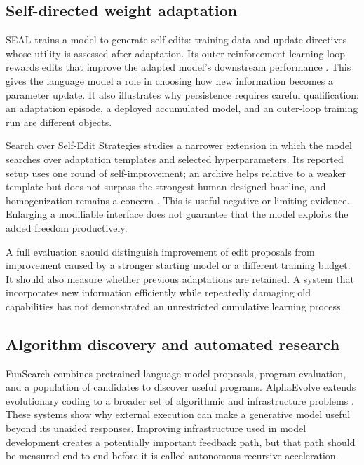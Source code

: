 \documentclass[11pt,american,]{article}
\begin{document}
\hypertarget{self-directed-weight-adaptation}{%
\subsection{Self-directed weight
adaptation}\label{self-directed-weight-adaptation}}

SEAL trains a model to generate self-edits: training data and update
directives whose utility is assessed after adaptation. Its outer
reinforcement-learning loop rewards edits that improve the adapted
model's downstream performance \citep{seal2025}. This gives the language
model a role in choosing how new information becomes a parameter update.
It also illustrates why persistence requires careful qualification: an
adaptation episode, a deployed accumulated model, and an outer-loop
training run are different objects.

Search over Self-Edit Strategies studies a narrower extension in which
the model searches over adaptation templates and selected
hyperparameters. Its reported setup uses one round of self-improvement;
an archive helps relative to a weaker template but does not surpass the
strongest human-designed baseline, and homogenization remains a concern
\citep{selfedit2026}. This is useful negative or limiting evidence.
Enlarging a modifiable interface does not guarantee that the model
exploits the added freedom productively.

A full evaluation should distinguish improvement of edit proposals from
improvement caused by a stronger starting model or a different training
budget. It should also measure whether previous adaptations are
retained. A system that incorporates new information efficiently while
repeatedly damaging old capabilities has not demonstrated an
unrestricted cumulative learning process.

\hypertarget{algorithm-discovery-and-automated-research}{%
\subsection{Algorithm discovery and automated
research}\label{algorithm-discovery-and-automated-research}}

FunSearch combines pretrained language-model proposals, program
evaluation, and a population of candidates to discover useful programs.
AlphaEvolve extends evolutionary coding to a broader set of algorithmic
and infrastructure problems \citep{funsearch2024, alphaevolve2025}.
These systems show why external execution can make a generative model
useful beyond its unaided responses. Improving infrastructure used in
model development creates a potentially important feedback path, but
that path should be measured end to end before it is called autonomous
recursive acceleration.
\end{document}
